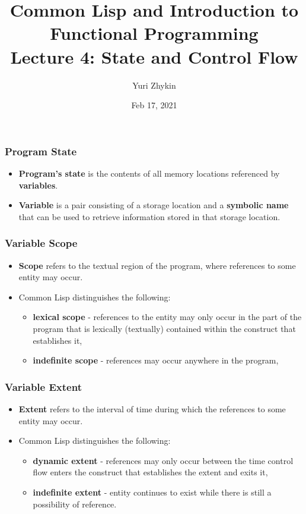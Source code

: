 \documentclass{beamer}
\title{
  Common Lisp and Introduction to Functional Programming \\
  Lecture 4: State and Control Flow
}
\author{Yuri Zhykin}
\date{Feb 17, 2021}
\begin{document}
\frame{\titlepage}

\begin{frame}[fragile]
  \frametitle{Program State}
  \begin{itemize}
  \item \textbf{Program's state} is the contents of all memory locations
    referenced by \textbf{variables}.
  \item \textbf{Variable} is a pair consisting of a storage location and a
    \textbf{symbolic name} that can be used to retrieve information stored in
    that storage location.
  \end{itemize}
\end{frame}

\begin{frame}[fragile]
  \frametitle{Variable Scope}
  \begin{itemize}
  \item \textbf{Scope} refers to the textual region of the program, where
    references to some entity may occur.
  \item Common Lisp distinguishes the following:
    \begin{itemize}
    \item \textbf{lexical scope} - references to the entity may only occur
      in the part of the program that is lexically (textually) contained within
      the construct that establishes it,
    \item \textbf{indefinite scope} - references may occur anywhere in the
      program,
    \end{itemize}
  \end{itemize}
\end{frame}

\begin{frame}[fragile]
  \frametitle{Variable Extent}
  \begin{itemize}
  \item \textbf{Extent} refers to the interval of time during which the
    references to some entity may occur. 
  \item Common Lisp distinguishes the following:
    \begin{itemize}
    \item \textbf{dynamic extent} - references may only occur between the time
      control flow enters the construct that establishes the extent and exits
      it,
    \item \textbf{indefinite extent} - entity continues to exist while there is
      still a possibility of reference.
    \end{itemize}
  \end{itemize}
\end{frame}
\end{document}
